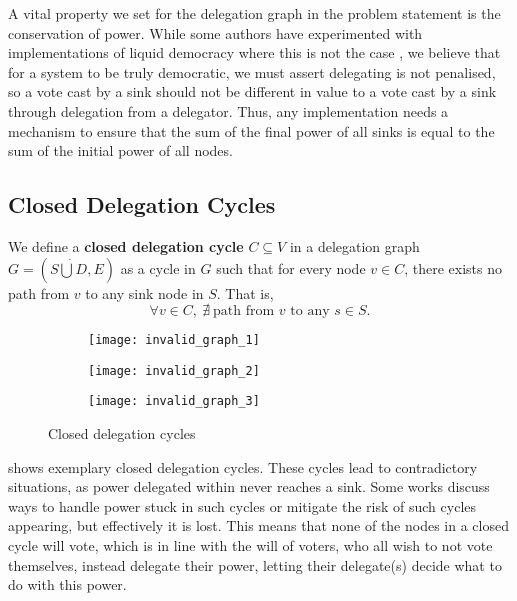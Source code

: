  A vital property we set for the delegation graph in the problem statement is the conservation of power. While some authors have experimented with implementations of liquid democracy where this is not the case \cite{bersetcheGeneralizingLiquidDemocracy2022, boldiViscousDemocracySocial2011}, we believe that for a system to be truly democratic, we must assert delegating is not penalised, so a vote cast by a sink should not be different in value to a vote cast by a sink through delegation from a delegator. Thus, any implementation needs a mechanism to ensure that the sum of the final power of all sinks is equal to the sum of the initial power of all nodes.

\subsection{Closed Delegation Cycles}

We define a \textbf{closed delegation cycle} $C \subseteq V$ in a delegation graph $G = (S \dot\bigcup D, E)$ as a cycle in $G$ such that for every node $v \in C$, there exists no path from $v$ to any sink node in $S$. That is,
\[
\forall v \in C,\ \nexists\ \text{path from } v \text{ to any } s \in S.
\]

\begin{figure}[t]
    \centering
    \begin{subfigure}[t]{0.32\textwidth}
        \centering
        \texttt{[image: invalid\_graph\_1]}
    \end{subfigure}
    \hfill
    \begin{subfigure}[t]{0.32\textwidth}
        \centering
        \texttt{[image: invalid\_graph\_2]}
    \end{subfigure}
    \hfill
    \begin{subfigure}[t]{0.32\textwidth}
        \centering
        \texttt{[image: invalid\_graph\_3]}
    \end{subfigure}
    \caption{Closed delegation cycles}
    \label{fig:closed-delegation-cycles}
\end{figure}

 shows exemplary closed delegation cycles. These cycles lead to contradictory situations, as power delegated within never reaches a sink. Some works discuss ways to handle power stuck in such cycles or mitigate the risk of such cycles appearing, but effectively it is lost. \cite{behrensCircularDelegationsMyth2015, brillInteractiveDemocracy2018} This means that none of the nodes in a closed cycle will vote, which is in line with the will of voters, who all wish to not vote themselves, instead delegate their power, letting their delegate(s) decide what to do with this power. 

